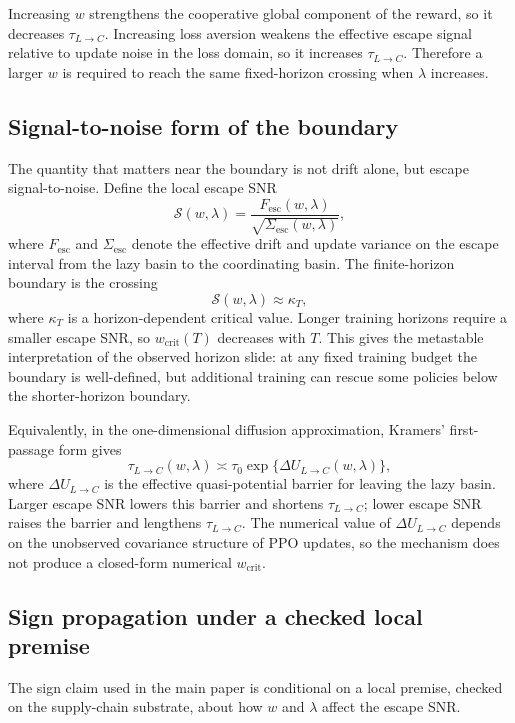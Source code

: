 \documentclass[letterpaper]{article} %
\theoremstyle{plain}
\newcommand{\wcrit}{w_{\mathrm{crit}}}
\begin{document}
Increasing $w$ strengthens the cooperative global component of the reward, so it decreases
$\tau_{L\to C}$. Increasing loss aversion weakens the effective escape signal relative to update
noise in the loss domain, so it increases $\tau_{L\to C}$. Therefore a larger $w$ is required to
reach the same fixed-horizon crossing when $\lambda$ increases.

\subsection{Signal-to-noise form of the boundary}
The quantity that matters near the boundary is not drift alone, but escape signal-to-noise. Define
the local escape SNR
\begin{equation}
 \mathcal{S}(w,\lambda)
 =
 \frac{F_{\mathrm{esc}}(w,\lambda)}
 {\sqrt{\Sigma_{\mathrm{esc}}(w,\lambda)}} ,
 \label{eq:escape_snr}
\end{equation}
where $F_{\mathrm{esc}}$ and $\Sigma_{\mathrm{esc}}$ denote the effective drift and update variance
on the escape interval from the lazy basin to the coordinating basin. The finite-horizon boundary
is the crossing
\begin{equation}
 \mathcal{S}(w,\lambda)\approx \kappa_T ,
\end{equation}
where $\kappa_T$ is a horizon-dependent critical value. Longer training horizons require a smaller
escape SNR, so $\wcrit(T)$ decreases with $T$. This gives the metastable interpretation of the
observed horizon slide: at any fixed training budget the boundary is well-defined, but additional
training can rescue some policies below the shorter-horizon boundary.

Equivalently, in the one-dimensional diffusion approximation, Kramers' first-passage form gives
\begin{equation}
 \tau_{L\to C}(w,\lambda)
 \asymp
 \tau_0
 \exp\{\Delta U_{L\to C}(w,\lambda)\},
 \label{eq:barrier}
\end{equation}
where $\Delta U_{L\to C}$ is the effective quasi-potential barrier for leaving the lazy basin.
Larger escape SNR lowers this barrier and shortens $\tau_{L\to C}$; lower escape SNR raises the
barrier and lengthens $\tau_{L\to C}$. The numerical value of $\Delta U_{L\to C}$ depends on the
unobserved covariance structure of PPO updates, so the mechanism does not produce a closed-form
numerical $\wcrit$.

\subsection{Sign propagation under a checked local premise}
The sign claim used in the main paper is conditional on a local premise, checked on the
supply-chain substrate, about how $w$ and $\lambda$ affect the escape SNR.
\end{document}
